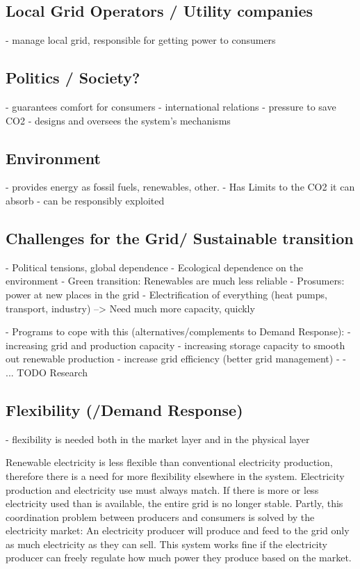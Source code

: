 \subsection{Local Grid Operators / Utility companies}
- manage local grid, responsible for getting power to consumers

\subsection{Politics / Society?}
- guarantees comfort for consumers
- international relations
- pressure to save CO2
- designs and oversees the system's mechanisms

\subsection{Environment}
- provides energy as fossil fuels, renewables, other.
- Has Limits to the CO2 it can absorb
- can be responsibly exploited

\subsection{Challenges for the Grid/ Sustainable transition}
- Political tensions, global dependence
- Ecological dependence on the environment
- Green transition: Renewables are much less reliable
- Prosumers: power at new places in the grid
- Electrification of everything (heat pumps, transport, industry) --> Need much more capacity, quickly

- Programs to cope with this (alternatives/complements to Demand Response):
    - increasing grid and production capacity
    - increasing storage capacity to smooth out renewable production
    - increase grid efficiency (better grid management)
    - 
    - ... TODO Research

\subsection{Flexibility (/Demand Response)}


- flexibility is needed both in the market layer and in the physical layer

Renewable electricity is less flexible than conventional electricity production, therefore there is a need for more flexibility elsewhere in the system.
Electricity production and electricity use must always match. If there is more or less electricity used than is available, the entire grid is no longer stable.
Partly, this coordination problem between producers and consumers is solved by the electricity market:
An electricity producer will produce and feed to the grid only as much electricity as they can sell.
This system works fine if the electricity producer can freely regulate how much power they produce based on the market.

